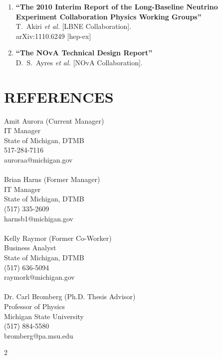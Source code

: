 \documentclass{res}
\begin{document}
\begin{resume}
\begin{enumerate}
\item%
{\bf ``The 2010 Interim Report of the Long-Baseline Neutrino Experiment Collaboration Physics Working Groups''}
  \\{}T.~Akiri {\it et al.}  [LBNE Collaboration].
  \\{}arXiv:1110.6249 [hep-ex]
  

\item%
{\bf ``The NOvA Technical Design Report''}
  \\{}D.~S.~Ayres {\it et al.}  [NOvA Collaboration].
  



\end{enumerate}

\section{REFERENCES}
\vspace{0.2in}
\begin{multicols}{2}
    Amit Aurora (Current Manager) \\
	IT Manager\\
	State of Michigan, DTMB\\
	517-284-7116\\
	auroraa@michigan.gov\\\\
	Brian Harns (Former Manager)\\
	IT Manager\\
	State of Michigan, DTMB\\
	(517) 335-2609 \\
	harnsb1@michigan.gov\\\\
	Kelly Raymor (Former Co-Worker)\\
	Business Analyst\\
	State of Michigan, DTMB\\
	(517) 636-5094\\
	raymork@michigan.gov\\\\
	Dr. Carl Bromberg (Ph.D. Thesis Advisor)\\
	Professor of Physics\\
	Michigan State University\\
	(517) 884-5580\\
	bromberg@pa.msu.edu
\end{multicols}{2}
\end{resume}
\end{document}
